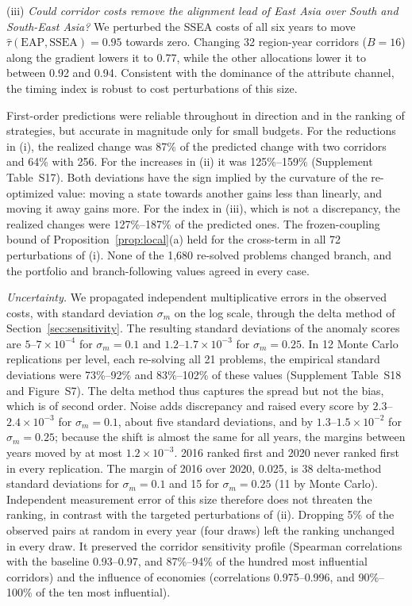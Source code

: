 (iii) \emph{Could corridor costs remove the alignment lead of East Asia over South and South-East Asia?} We perturbed the SSEA costs of all six years to move $\hat\tau(\mathrm{EAP},\mathrm{SSEA})=0.95$ towards zero. Changing 32 region-year corridors ($B=16$) along the gradient lowers it to 0.77, while the other allocations lower it to between 0.92 and 0.94. Consistent with the dominance of the attribute channel, the timing index is robust to cost perturbations of this size.

First-order predictions were reliable throughout in direction and in the ranking of strategies, but accurate in magnitude only for small budgets. For the reductions in (i), the realized change was 87\% of the predicted change with two corridors and 64\% with 256. For the increases in (ii) it was 125\%--159\% (Supplement Table~S17). Both deviations have the sign implied by the curvature of the re-optimized value: moving a state towards another gains less than linearly, and moving it away gains more. For the index in (iii), which is not a discrepancy, the realized changes were 127\%--187\% of the predicted ones. The frozen-coupling bound of Proposition~\ref{prop:local}(a) held for the cross-term in all 72 perturbations of (i). None of the 1{,}680 re-solved problems changed branch, and the portfolio and branch-following values agreed in every case.

\emph{Uncertainty.} We propagated independent multiplicative errors in the observed costs, with standard deviation $\sigma_m$ on the log scale, through the delta method of Section~\ref{sec:sensitivity}. The resulting standard deviations of the anomaly scores are $5$--$7\times10^{-4}$ for $\sigma_m=0.1$ and $1.2$--$1.7\times10^{-3}$ for $\sigma_m=0.25$. In 12 Monte Carlo replications per level, each re-solving all 21 problems, the empirical standard deviations were 73\%--92\% and 83\%--102\% of these values (Supplement Table~S18 and Figure~S7). The delta method thus captures the spread but not the bias, which is of second order. Noise adds discrepancy and raised every score by $2.3$--$2.4\times10^{-3}$ for $\sigma_m=0.1$, about five standard deviations, and by $1.3$--$1.5\times10^{-2}$ for $\sigma_m=0.25$; because the shift is almost the same for all years, the margins between years moved by at most $1.2\times10^{-3}$. 2016 ranked first and 2020 never ranked first in every replication. The margin of 2016 over 2020, 0.025, is 38 delta-method standard deviations for $\sigma_m=0.1$ and 15 for $\sigma_m=0.25$ (11 by Monte Carlo). Independent measurement error of this size therefore does not threaten the ranking, in contrast with the targeted perturbations of (ii). Dropping 5\% of the observed pairs at random in every year (four draws) left the ranking unchanged in every draw. It preserved the corridor sensitivity profile (Spearman correlations with the baseline 0.93--0.97, and 87\%--94\% of the hundred most influential corridors) and the influence of economies (correlations 0.975--0.996, and 90\%--100\% of the ten most influential).

